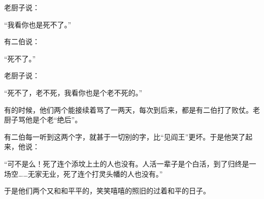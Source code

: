 \par 老厨子说：
\par “我看你也是死不了。”
\par 有二伯说：
\par “死不了。”
\par 老厨子说：
\par “死不了，老不死，我看你也是个老不死的。”
\par 有的时候，他们两个能接续着骂了一两天，每次到后来，都是有二伯打了败仗。老厨子骂他是个老“绝后”。
\par 有二伯每一听到这两个字，就甚于一切别的字，比“见阎王”更坏。于是他哭了起来，他说：
\par “可不是么！死了连个添坟上土的人也没有。人活一辈子是个白活，到了归终是一场空……无家无业，死了连个打灵头幡的人也没有。”
\par 于是他们两个又和和平平的，笑笑嘻嘻的照旧的过着和平的日子。
